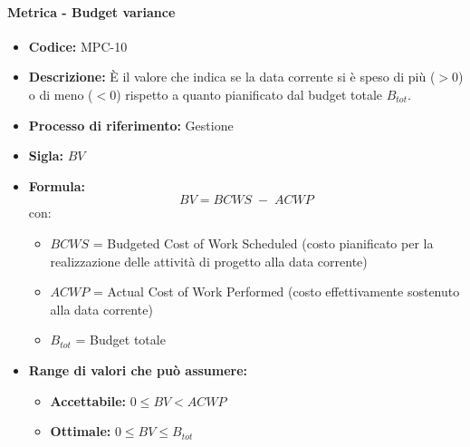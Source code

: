     \paragraph{Metrica - Budget variance}
        \begin{itemize}
            \item \textbf{Codice:} MPC-10 
            \item \textbf{Descrizione:} È il valore che indica se la data corrente si è speso di più ($>0$) o di meno ($<0$) rispetto a quanto pianificato dal budget totale $B_{tot}$.
            \item \textbf{Processo di riferimento:} Gestione
            \item \textbf{Sigla:} $BV$
            \item \textbf{Formula:} $$BV = {BCWS \; - \; ACWP}$$
            con:
            \begin{itemize}
                \item $BCWS$ = Budgeted Cost of Work Scheduled (costo pianificato per la realizzazione delle attività di progetto alla data corrente)
                \item $ACWP$ = Actual Cost of Work Performed (costo effettivamente sostenuto alla data corrente)
                \item $B_{tot}$ = Budget totale
            \end{itemize}
            \item \textbf{Range di valori che può assumere:}
            \begin{itemize}
                \item \textbf{Accettabile:} $0 \leq BV < ACWP$
                \item \textbf{Ottimale:} $0 \leq BV \leq B_{tot}$
            \end{itemize}
        \end{itemize}

\newpage
